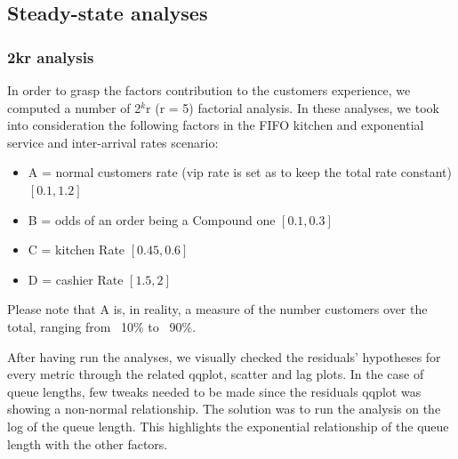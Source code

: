 \subsection{Steady-state analyses}

\subsubsection{2kr analysis}\label{sec:2kr}
In order to grasp the factors contribution to the customers experience, we computed a number of 2$^k$r (r = 5) factorial analysis. In these analyses, we took into 
consideration the following factors in the FIFO kitchen and exponential service and inter-arrival rates scenario: 
\begin{itemize}
  \item A = normal customers rate (vip rate is set as to keep the total rate constant) $[0.1, 1.2]$
  \item B = odds of an order being a Compound one $[0.1, 0.3]$
  \item C = kitchen Rate $[0.45, 0.6]$
  \item D = cashier Rate $[1.5, 2]$
\end{itemize}
Please note that A is, in reality, a measure of the number customers 
over the total, ranging from ~10\% to ~90\%.

After having run the analyses, we visually checked the residuals' hypotheses for every metric through the related qqplot, scatter and lag plots. In the case of queue lengths, few tweaks needed to be made since the residuals qqplot was showing a non-normal relationship. The solution was to run the analysis on the log of the queue length. This highlights the exponential relationship of the queue length with the other factors.


